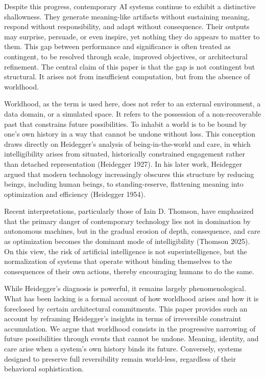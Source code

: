 \documentclass[11pt]{article}
\theoremstyle{remark}
\begin{document}
Despite this progress, contemporary AI systems continue to exhibit a distinctive shallowness. They generate meaning-like artifacts without sustaining meaning, respond without responsibility, and adapt without consequence. Their outputs may surprise, persuade, or even inspire, yet nothing they do appears to matter to them. This gap between performance and significance is often treated as contingent, to be resolved through scale, improved objectives, or architectural refinement. The central claim of this paper is that the gap is not contingent but structural. It arises not from insufficient computation, but from the absence of worldhood.

Worldhood, as the term is used here, does not refer to an external environment, a data domain, or a simulated space. It refers to the possession of a non-recoverable past that constrains future possibilities. To inhabit a world is to be bound by one’s own history in a way that cannot be undone without loss. This conception draws directly on Heidegger’s analysis of being-in-the-world and care, in which intelligibility arises from situated, historically constrained engagement rather than detached representation (Heidegger 1927). In his later work, Heidegger argued that modern technology increasingly obscures this structure by reducing beings, including human beings, to standing-reserve, flattening meaning into optimization and efficiency (Heidegger 1954).

Recent interpretations, particularly those of Iain D. Thomson, have emphasized that the primary danger of contemporary technology lies not in domination by autonomous machines, but in the gradual erosion of depth, consequence, and care as optimization becomes the dominant mode of intelligibility (Thomson 2025). On this view, the risk of artificial intelligence is not superintelligence, but the normalization of systems that operate without binding themselves to the consequences of their own actions, thereby encouraging humans to do the same.

While Heidegger’s diagnosis is powerful, it remains largely phenomenological. What has been lacking is a formal account of how worldhood arises and how it is foreclosed by certain architectural commitments. This paper provides such an account by reframing Heidegger’s insights in terms of irreversible constraint accumulation. We argue that worldhood consists in the progressive narrowing of future possibilities through events that cannot be undone. Meaning, identity, and care arise when a system’s own history binds its future. Conversely, systems designed to preserve full reversibility remain world-less, regardless of their behavioral sophistication.
\end{document}
